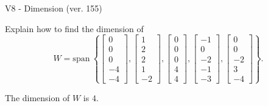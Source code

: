 \begin{exercise}
  \begin{exerciseTitle}V8 - Dimension (ver. 155)\end{exerciseTitle}
  \begin{exerciseStatement}
    Explain how to find the dimension of 
\[W=\mathrm{span}\ \left\{\left[\begin{array}{r}
0 \\
0 \\
0 \\
-4 \\
-4
\end{array}\right] , \left[\begin{array}{r}
1 \\
2 \\
2 \\
1 \\
-2
\end{array}\right] , \left[\begin{array}{r}
0 \\
0 \\
0 \\
4 \\
4
\end{array}\right] , \left[\begin{array}{r}
-1 \\
0 \\
-2 \\
-1 \\
-3
\end{array}\right] , \left[\begin{array}{r}
0 \\
0 \\
-2 \\
3 \\
-4
\end{array}\right]\right\}.\]



  \end{exerciseStatement}
  \begin{exerciseAnswer}
   The dimension of \(W\) is  \(4\).
  


  \end{exerciseAnswer}
\end{exercise}